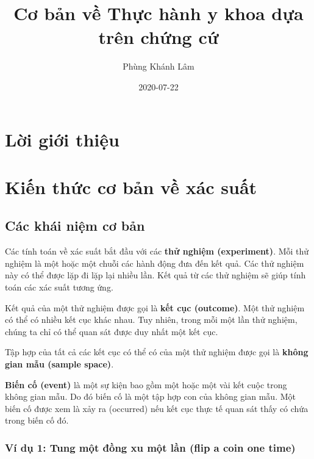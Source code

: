 \documentclass[
]{book}
\title{Cơ bản về Thực hành y khoa dựa trên chứng cứ}
\author{Phùng Khánh Lâm}
\date{2020-07-22}
\begin{document}
\maketitle

{
\setcounter{tocdepth}{1}
\tableofcontents
}
\hypertarget{lux1eddi-giux1edbi-thiux1ec7u}{%
\chapter*{Lời giới thiệu}\label{lux1eddi-giux1edbi-thiux1ec7u}}

\hypertarget{prob}{%
\chapter{Kiến thức cơ bản về xác suất}\label{prob}}

\hypertarget{cuxe1c-khuxe1i-niux1ec7m-cux1a1-bux1ea3n}{%
\section{Các khái niệm cơ bản}\label{cuxe1c-khuxe1i-niux1ec7m-cux1a1-bux1ea3n}}

Các tính toán về xác suất bắt đầu với các \textbf{thử nghiệm (experiment)}. Mỗi thử nghiệm là một hoặc một chuỗi các hành động đưa đến kết quả. Các thử nghiệm này có thể được lặp đi lặp lại nhiều lần. Kết quả từ các thử nghiệm sẽ giúp tính toán các xác suất tương ứng.

Kết quả của một thử nghiệm được gọi là \textbf{kết cục (outcome)}. Một thử nghiệm có thể có nhiều kết cục khác nhau. Tuy nhiên, trong mỗi một lần thử nghiệm, chúng ta chỉ có thể quan sát được duy nhất một kết cục.

Tập hợp của tất cả các kết cục có thể có của một thử nghiệm được gọi là \textbf{không gian mẫu (sample space)}.

\textbf{Biến cố (event)} là một sự kiện bao gồm một hoặc một vài kết cuộc trong không gian mẫu. Do đó biến cố là một tập hợp con của không gian mẫu. Một biến cố được xem là xảy ra (occurred) nếu kết cục thực tế quan sát thấy có chứa trong biến cố đó.

\hypertarget{vuxed-dux1ee5-1-tung-mux1ed9t-ux111ux1ed3ng-xu-mux1ed9t-lux1ea7n-flip-a-coin-one-time}{%
\subsection{Ví dụ 1: Tung một đồng xu một lần (flip a coin one time)}\label{vuxed-dux1ee5-1-tung-mux1ed9t-ux111ux1ed3ng-xu-mux1ed9t-lux1ea7n-flip-a-coin-one-time}}
\end{document}
